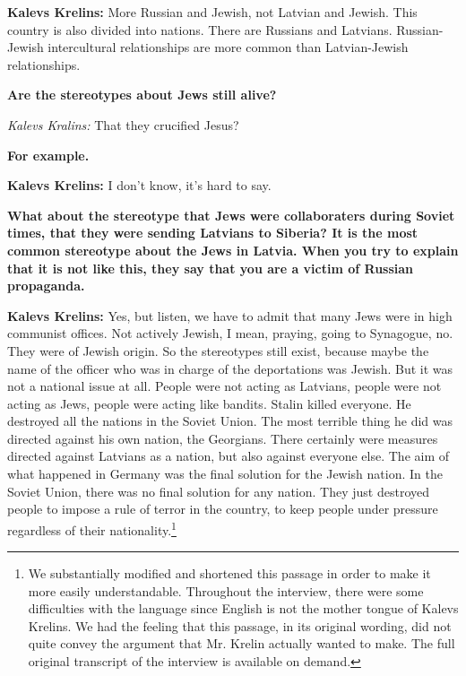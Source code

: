 \textbf{Kalevs Krelins:} More Russian and Jewish, not Latvian and Jewish. This country is also divided into nations. There are Russians and Latvians. Russian-Jewish intercultural relationships are more common than Latvian-Jewish relationships.    

\textbf{Are the stereotypes about Jews still alive?} 

\textit{Kalevs Kralins:} That they crucified Jesus? 

\textbf{For example.}  

\textbf{Kalevs Krelins:} I don’t know, it's hard to say.  

\textbf{What about the stereotype that Jews were collaboraters during Soviet times, that they were sending Latvians to Siberia? It is the most common stereotype about the Jews in Latvia.  When you try to explain that it is not like this, they say that you are a victim of Russian propaganda.}  

\textbf{Kalevs Krelins:} Yes, but listen, we have to admit that many Jews were in high communist offices. Not actively Jewish, I mean, praying, going to Synagogue, no. They were of Jewish origin. So the stereotypes still exist, because maybe the name of the officer who was in charge of the deportations was Jewish. But it was not a national issue at all. People were not acting as Latvians, people were not acting as Jews, people were acting like bandits. Stalin killed everyone. He destroyed all the nations in the Soviet Union. The most terrible thing he did was directed against his own nation, the Georgians. There certainly were measures directed against Latvians as a nation, but also against everyone else. The aim of what happened in Germany was the final solution for the Jewish nation. In the Soviet Union, there was no final solution for any nation. They just destroyed people to impose a rule of terror in the country, to keep people under pressure regardless of their nationality.\footnote{We substantially modified and shortened this passage in order to make it more easily understandable. Throughout the interview, there were some difficulties with the language since English is not the mother tongue of Kalevs Krelins. We had the feeling that this passage, in its original wording, did not quite convey the argument that Mr. Krelin actually wanted to make. The full original transcript of the interview is available on demand.}